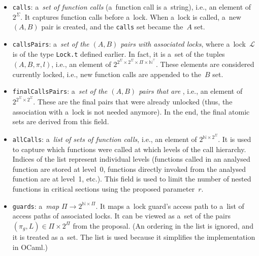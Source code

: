 \begin{itemize}
    \item \texttt{calls}: a~\emph{set of function calls} (a~function call is a~string), i.e., an element of~$ 2^\Sigma $. It captures function calls before a~lock. When a~lock is called, a~new $ (A, B) $ pair is created, and the \texttt{calls} set became the~$ A $ set.
    
    \item \texttt{callsPairs}: a~\emph{set of the $ (A, B) $ pairs with associated locks}, where a~lock~$ \mathcal{L} $ is of the type \texttt{Lock.t} defined earlier. In fact, it is a~set of the tuples $ (A, B, \pi, l) $, i.e., an element of $ 2^{2^\Sigma \times 2^\Sigma \times \Pi \times \mathbb{N}^\top} $. These elements are considered currently locked, i.e., new function calls are appended to the~$ B $ set.
    
    \item \texttt{finalCallsPairs}: a~\emph{set of the $ (A, B) $ pairs that are }, i.e., an element of $ 2^{2^\Sigma \times 2^\Sigma} $. These are the final pairs that were already unlocked (thus, the association with a~lock is not needed anymore). In the end, the final atomic sets are derived from this field.
    
    \item \texttt{allCalls}: a~\emph{list of sets of function calls}, i.e., an element of $ 2^{\mathbb{N} \times 2^\Sigma} $. It is used to capture which functions were called at which levels of the call hierarchy. Indices of the list represent individual levels (functions called in an analysed function are stored at level~0, functions directly invoked from the analysed function are at level~1, etc.). This field is used to limit the number of nested functions in critical sections using the proposed parameter~$ r $.
    
    \item \texttt{guards}: a~\emph{map $ \Pi \rightarrow 2^{\mathbb{N} \times \Pi} $}. It maps a~lock guard's access path to a~list of access paths of associated locks. It can be viewed as a~set of the pairs $ (\pi_g, L) \in \Pi \times 2^\Pi $ from the proposal. (An ordering in the list is ignored, and it is treated as a~set. The list is used because it simplifies the implementation in OCaml.)
\end{itemize}

